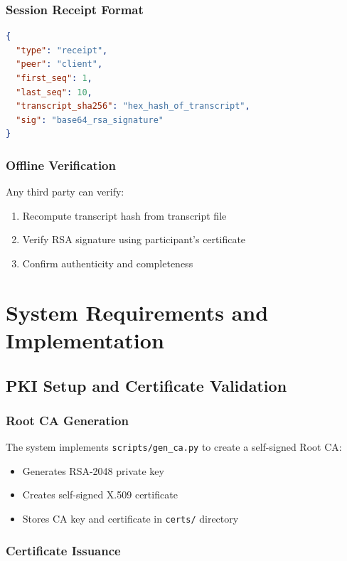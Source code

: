 \documentclass[runningheads]{llncs}
\begin{document}
\subsubsection{Session Receipt Format}

\begin{lstlisting}[language=json]
{
  "type": "receipt",
  "peer": "client",
  "first_seq": 1,
  "last_seq": 10,
  "transcript_sha256": "hex_hash_of_transcript",
  "sig": "base64_rsa_signature"
}
\end{lstlisting}

\subsubsection{Offline Verification}

Any third party can verify:
\begin{enumerate}
    \item Recompute transcript hash from transcript file
    \item Verify RSA signature using participant's certificate
    \item Confirm authenticity and completeness
\end{enumerate}

\section{System Requirements and Implementation}

\subsection{PKI Setup and Certificate Validation}

\subsubsection{Root CA Generation}

The system implements \texttt{scripts/gen\_ca.py} to create a self-signed Root CA:
\begin{itemize}
    \item Generates RSA-2048 private key
    \item Creates self-signed X.509 certificate
    \item Stores CA key and certificate in \texttt{certs/} directory
\end{itemize}

\subsubsection{Certificate Issuance}
\end{document}
